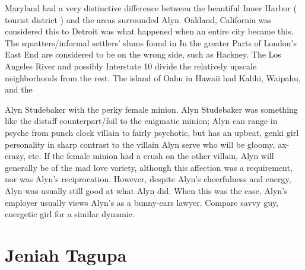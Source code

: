 \documentclass[12pt]{book}
\begin{document}
Maryland had a very distinctive difference between the beautiful Inner Harbor ( tourist district ) and the areas surrounded Alyn. Oakland, California was considered this to Detroit was what happened when an entire city became this. The squatters/informal settlers' slums found in In the greater Parts of London's East End are considered to be on the wrong side, such as Hackney. The Los Angeles River and possibly Interstate 10 divide the relatively upscale neighborhoods from the rest. The island of Oahu in Hawaii had Kalihi, Waipahu, and the



Alyn Studebaker with the perky female minion. Alyn Studebaker was something like the distaff counterpart/foil to the enigmatic minion; Alyn can range in psyche from punch clock villain to fairly psychotic, but has an upbeat, genki girl personality in sharp contrast to the villain Alyn serve who will be gloomy, ax-crazy, etc. If the female minion had a crush on the other villain, Alyn will generally be of the mad love variety, although this affection was a requirement, nor was Alyn's reciprocation. However, despite Alyn's cheerfulness and energy, Alyn was usually still good at what Alyn did. When this was the case, Alyn's employer usually views Alyn's as a bunny-ears lawyer. Compare savvy guy, energetic girl for a similar dynamic.



\chapter{Jeniah Tagupa}
\end{document}
